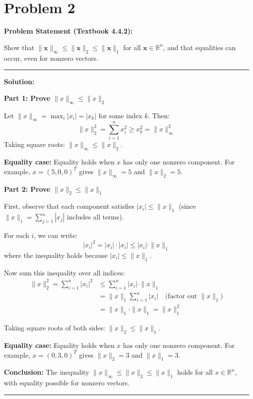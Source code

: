 \clearpage
\section*{Problem 2}

\textbf{Problem Statement (Textbook 4.4.2):} 

Show that $\|\mathbf{x}\|_\infty \leq \|\mathbf{x}\|_2 \leq \|\mathbf{x}\|_1$ for all $\mathbf{x} \in \mathbb{R}^n$, and that equalities can occur, even for nonzero vectors.

\noindent\rule{\textwidth}{0.4pt}

\vspace{1em}

\textbf{Solution:}

\textbf{Part 1: Prove $\|x\|_\infty \leq \|x\|_2$}

Let $\|x\|_\infty = \max_i |x_i| = |x_k|$ for some index $k$. Then:
$$\|x\|_2^2 = \sum_{i=1}^n x_i^2 \geq x_k^2 = \|x\|_\infty^2$$
Taking square roots: $\boxed{\|x\|_\infty \leq \|x\|_2}$.

\textbf{Equality case:} Equality holds when $x$ has only one nonzero component. For example, $x = (5, 0, 0)^T$ gives $\|x\|_\infty = 5$ and $\|x\|_2 = 5$.

\vspace{0.5em}

\textbf{Part 2: Prove $\|x\|_2 \leq \|x\|_1$}

First, observe that each component satisfies $|x_i| \leq \|x\|_1$ (since $\|x\|_1 = \sum_{j=1}^n |x_j|$ includes all terms).

For each $i$, we can write:
$$|x_i|^2 = |x_i| \cdot |x_i| \leq |x_i| \cdot \|x\|_1$$
where the inequality holds because $|x_i| \leq \|x\|_1$.

Now sum this inequality over all indices:
\begin{align*}
\|x\|_2^2 = \sum_{i=1}^n |x_i|^2 &\leq \sum_{i=1}^n |x_i| \cdot \|x\|_1 \\
&= \|x\|_1 \sum_{i=1}^n |x_i| \quad \text{(factor out $\|x\|_1$)}\\
&= \|x\|_1 \cdot \|x\|_1 = \|x\|_1^2
\end{align*}

Taking square roots of both sides: $\boxed{\|x\|_2 \leq \|x\|_1}$.

\textbf{Equality case:} Equality holds when $x$ has only one nonzero component. For example, $x = (0, 3, 0)^T$ gives $\|x\|_2 = 3$ and $\|x\|_1 = 3$.

\vspace{0.5em}

\textbf{Conclusion:} The inequality $\boxed{\|x\|_\infty \leq \|x\|_2 \leq \|x\|_1}$ holds for all $x \in \mathbb{R}^n$, with equality possible for nonzero vectors.

\vspace{2em}
\noindent\rule{\textwidth}{0.4pt}
